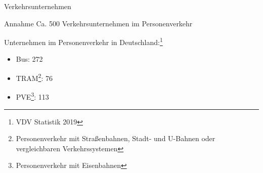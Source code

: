 
\begin{frame}{Verkehrsunternehmen}

  \begin{block}{Annahme}
    Ca. 500 Verkehrsunternehmen im Personenverkehr
  \end{block}

  Unternehmen im Personenverkehr in Deutschland:\footnote{VDV Statistik 2019}
  \begin{itemize}
    \item Bus: 272
    \item TRAM\footnote{Personenverkehr mit Straßenbahnen, Stadt- und U-Bahnen oder vergleichbaren Verkehrssystemen}: 76
    \item PVE\footnote{Personenverkehr mit Eisenbahnen}: 113
  \end{itemize}
\end{frame}
